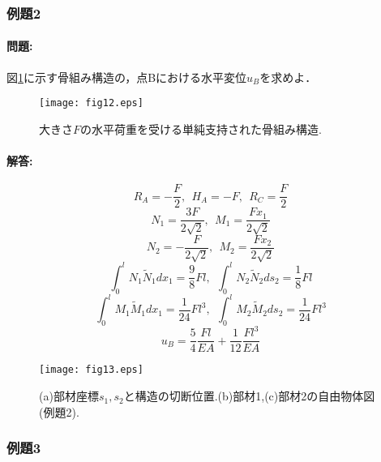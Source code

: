 \documentclass[10pt,a4j]{jarticle}
\begin{document}
\subsubsection{例題2}
\paragraph{問題:}
図\ref{fig:fig12}に示す骨組み構造の，点Bにおける水平変位$u_B$を求めよ．
\begin{figure}[h]
	\begin{center}
	\texttt{[image: fig12.eps]} 
	\end{center}
	\caption{大きさ$F$の水平荷重を受ける単純支持された骨組み構造.} 
	\label{fig:fig12}
\end{figure}
\paragraph{解答:}
\begin{equation}
	R_A=-\frac{F}{2}, \ \ H_A=-F, \ \ R_C=\frac{F}{2}
	\label{eqn:}
\end{equation}
\begin{equation}
	N_1=\frac{3F}{2\sqrt{2}}, \ \ M_1=\frac{Fx_1}{2\sqrt{2}}
	\label{eqn:}
\end{equation}
\begin{equation}
	N_2=-\frac{F}{2\sqrt{2}}, \ \ M_2=\frac{Fx_2}{2\sqrt{2}}
	\label{eqn:}
\end{equation}
\begin{equation}
	\int_0^l N_1\tilde N_1dx_1=\frac{9}{8}Fl, \ \ 
	\int_0^l N_2\tilde N_2ds_2=\frac{1}{8}Fl
	\label{eqn:}
\end{equation}
\begin{equation}
	\int_0^l M_1\tilde M_1dx_1=\frac{1}{24}Fl^3, \ \ 
	\int_0^l M_2\tilde M_2ds_2=\frac{1}{24}Fl^3
	\label{eqn:}
\end{equation}
\begin{equation}
	u_B=\frac{5}{4}\frac{Fl}{EA}
	+
	\frac{1}{12}\frac{Fl^3}{EA}
	\label{eqn:}
\end{equation}
\begin{figure}[h]
	\begin{center}
	\texttt{[image: fig13.eps]} 
	\end{center}
	\caption{(a)部材座標$s_1,s_2$と構造の切断位置.(b)部材1,(c)部材2の自由物体図(例題2).} 
	\label{fig:fig13}
\end{figure}
\subsubsection{例題3}
\end{document}
